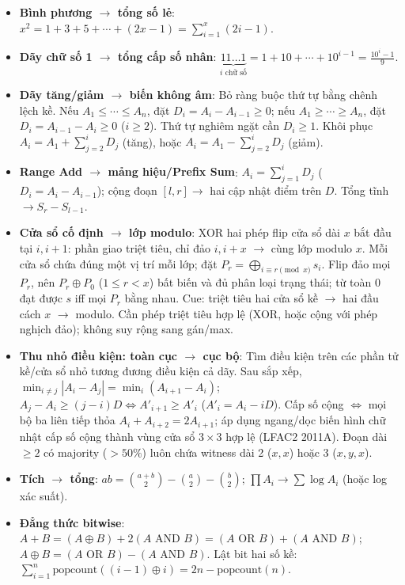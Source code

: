 \begin{itemize}
    \item \textbf{Bình phương $\to$ tổng số lẻ}: $x^2=1+3+5+\cdots+(2x-1)=\sum_{i=1}^x(2i-1)$.

    \item \textbf{Dãy chữ số 1 $\to$ tổng cấp số nhân}: $\underbrace{11\ldots1}_{i\text{ chữ số}}=1+10+\cdots+10^{i-1}=\frac{10^i-1}{9}$.

    \item \textbf{Dãy tăng/giảm $\to$ biến không âm}: Bỏ ràng buộc thứ tự bằng chênh lệch kề. Nếu $A_1\le\cdots\le A_n$, đặt $D_i=A_i-A_{i-1}\ge0$; nếu $A_1\ge\cdots\ge A_n$, đặt $D_i=A_{i-1}-A_i\ge0$ ($i\ge2$). Thứ tự nghiêm ngặt cần $D_i\ge1$. Khôi phục $A_i=A_1+\sum_{j=2}^iD_j$ (tăng), hoặc $A_i=A_1-\sum_{j=2}^iD_j$ (giảm).

    \item \textbf{Range Add $\to$ mảng hiệu/Prefix Sum}: $A_i=\sum_{j=1}^iD_j$ ($D_i=A_i-A_{i-1}$); cộng đoạn $[l,r]\to$ hai cập nhật điểm trên $D$. Tổng tĩnh $\to S_r-S_{l-1}$.

    \item \textbf{Cửa sổ cố định $\to$ lớp modulo}: XOR hai phép flip cửa sổ dài $x$ bắt đầu tại $i,i+1$: phần giao triệt tiêu, chỉ đảo $i,i+x$ $\to$ cùng lớp modulo $x$. Mỗi cửa sổ chứa đúng một vị trí mỗi lớp; đặt $P_r=\bigoplus_{i\equiv r\pmod x}s_i$. Flip đảo mọi $P_r$, nên $P_r\oplus P_0$ ($1\le r<x$) bất biến và đủ phân loại trạng thái; từ toàn 0 đạt được $s$ iff mọi $P_r$ bằng nhau. Cue: triệt tiêu hai cửa sổ kề $\to$ hai đầu cách $x$ $\to$ modulo. Cần phép triệt tiêu hợp lệ (XOR, hoặc cộng với phép nghịch đảo); không suy rộng sang gán/max.

    \item \textbf{Thu nhỏ điều kiện: toàn cục $\to$ cục bộ}: Tìm điều kiện trên các phần tử kề/cửa sổ nhỏ tương đương điều kiện cả dãy. Sau sắp xếp, $\min_{i\ne j}|A_i-A_j|=\min_i(A_{i+1}-A_i)$; $A_j-A_i\ge(j-i)D\iff A'_{i+1}\ge A'_i$ ($A'_i=A_i-iD$). Cấp số cộng $\iff$ mọi bộ ba liên tiếp thỏa $A_i+A_{i+2}=2A_{i+1}$; áp dụng ngang/dọc biến hình chữ nhật cấp số cộng thành vùng cửa sổ $3\times3$ hợp lệ (LFAC2 2011A). Đoạn dài $\ge2$ có majority ($>50\%$) luôn chứa witness dài 2 ($x,x$) hoặc 3 ($x,y,x$).

    \item \textbf{Tích $\to$ tổng}: $ab=\binom{a+b}{2}-\binom a2-\binom b2$; $\prod A_i\to\sum\log A_i$ (hoặc log xác suất).

    \item \textbf{Đẳng thức bitwise}: $A+B=(A\oplus B)+2(A\text{ AND }B)=(A\text{ OR }B)+(A\text{ AND }B)$; $A\oplus B=(A\text{ OR }B)-(A\text{ AND }B)$. Lật bit hai số kề: $\sum_{i=1}^n\text{popcount}((i-1)\oplus i)=2n-\text{popcount}(n)$.


\end{itemize}

